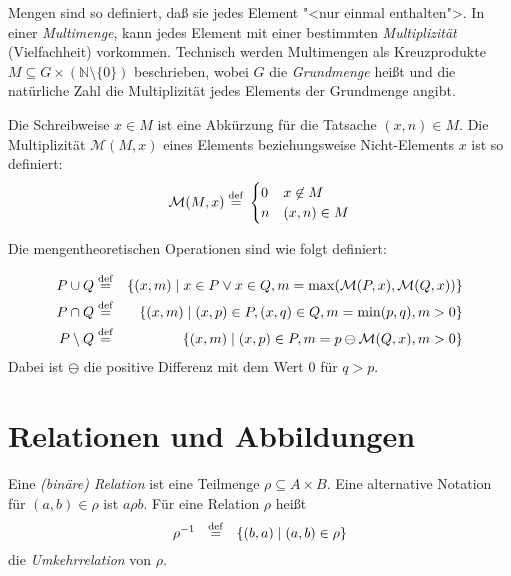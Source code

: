 Mengen sind so definiert, daß sie jedes Element "<nur einmal enthalten">. 
In einer \emph{Multimenge},
 kann jedes Element mit einer bestimmten
\emph{Multiplizität} (Vielfachheit) vorkommen.  Technisch werden
Multimengen als Kreuzprodukte $M \subseteq G \times (\mathbb{N}\setminus\{0\})$ beschrieben, wobei $G$
die \emph{Grundmenge} heißt und die natürliche Zahl die Multiplizität jedes Elements
der Grundmenge angibt.

Die Schreibweise $x\in M$ ist eine Abkürzung für
die Tatsache $(x,n)\in M$.  Die Multiplizität $\mathcal{M}(M, x)$ eines Elements beziehungsweise
Nicht-Elements $x$  ist so definiert:
%
\begin{displaymath}
  \mathcal{M}(M, x)\stackrel{\rm def}{=}{}
  \begin{cases}
    0 & x\not\in M\\
    n & (x, n)\in M
  \end{cases}
\end{displaymath}

Die mengentheoretischen Operationen sind wie folgt definiert:

\begin{eqnarray*}
  P\cup Q &\stackrel{\rm def}{=}& \{(x,m)\mid x\in P \vee x \in Q,
  m=\max(\mathcal{M}(P, x), \mathcal{M}(Q, x))\}\\
  P\cap Q &\stackrel{\rm def}{=}& \{(x,m)\mid(x,p)\in P, (x,q)\in Q, m=\min(p,q), m > 0\}\\
  P\setminus Q &\stackrel{\rm def}{=}& \{(x,m)\mid (x, p)\in P, m = p\ominus \mathcal{M}(Q, x), m > 0\}
\end{eqnarray*}
Dabei ist $\ominus$ die positive Differenz mit dem Wert $0$ für
$q>p$.

\section{Relationen und Abbildungen}
\label{sec:relationen}

\begin{definition} Eine \emph{(binäre) Relation}
ist eine Teilmenge $\rho \subseteq A \times B$.
Eine alternative Notation für $(a,b)\in\rho$ ist
$a\rho b$.
Für eine Relation $\rho$ heißt
\[ \rho^{-1}\ \ \stackrel{\rm def}{=}\ \ \{(b,a)\mid (a,b) \in \rho\}\]
die \emph{Umkehrrelation} 
von $\rho$. 
\end{definition}

